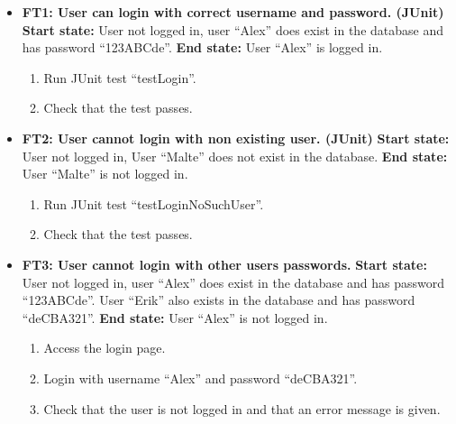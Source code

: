 \documentclass{article}
\begin{document}
	\begin{itemize}
		\item \textbf{FT1:  User can login with correct username and 			password. (JUnit)} \newline
		\textbf{Start state:} User not logged in, user “Alex” does exist in the database and has password “123ABCde”. \newline
		\textbf{End state:} User “Alex” is logged in. 
		\begin{enumerate}
			\item Run JUnit test “testLogin”.
			\item Check that the test passes.
		\end{enumerate}
		
		\item \textbf{FT2:  User cannot login with non existing user. (JUnit)} \newline
		\textbf{Start state:} User not logged in, User “Malte” does not exist in the database. \newline
		\textbf{End state:} User “Malte” is not logged in.  
		\begin{enumerate}
			\item Run JUnit test “testLoginNoSuchUser”.
			\item Check that the test passes.
		\end{enumerate}
		
		\item \textbf{FT3: User cannot login with other users passwords.} \newline
		\textbf{Start state:} User not logged in, user “Alex” does exist in the database and has password “123ABCde”. User “Erik” also exists in the database and has password “deCBA321”. \newline
		\textbf{End state:} User “Alex” is not logged in.   
		\begin{enumerate}
			\item  Access the login page. 
			\item Login with username “Alex” and password “deCBA321”. 
			\item Check that the user is not logged in and that an error message is given.
		\end{enumerate}
		

\end{itemize}
\end{document}
